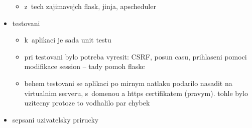 \begin{itemize}
\begin{itemize}
        \item z~tech zajimavejch flask, jinja, apscheduler
    \end{itemize}
    \item testovani
    \begin{itemize}
        \item k~aplikaci je sada unit testu
        \item pri testovani bylo potreba vyresit: CSRF, posun casu, prihlaseni pomoci modifikace session -- tady pomoh flaskc
        \item behem testovani se aplikaci po mirnym natlaku podarilo nasadit na virtualnim serveru, s~domenou a https certifikatem (pravym). tohle bylo uzitecny protoze to vodhalilo par chybek
    \end{itemize}
    \item sepsani uzivatelsky prirucky
\end{itemize}
